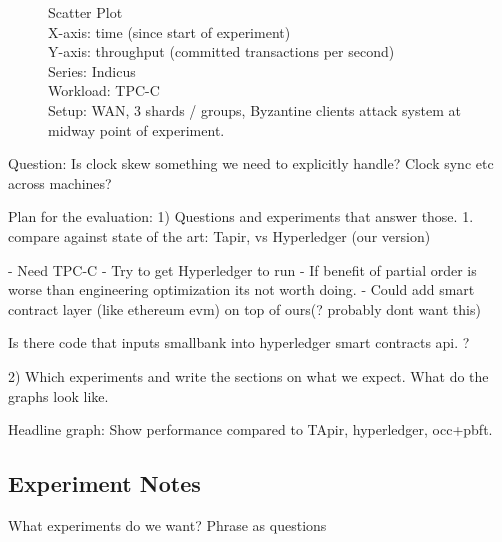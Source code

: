 \begin{figure}
  Scatter Plot\\
  X-axis: time (since start of experiment)\\
  Y-axis: throughput (committed transactions per second)\\
  Series: Indicus\\
  Workload: TPC-C\\
  Setup: WAN, 3 shards / groups, Byzantine clients attack system at midway point
  of experiment.\\
\end{figure}


Question: Is clock skew something we need to explicitly handle? Clock sync etc across machines?

Plan for the evaluation:
1) Questions and experiments that answer those.
  1. compare against state of the art: Tapir, vs Hyperledger (our version)
  

- Need TPC-C
- Try to get Hyperledger to run
- If benefit of partial order is worse than engineering optimization its not worth doing. 
- Could add smart contract layer (like ethereum evm) on top of ours(? probably dont want this)

Is there code that inputs smallbank into hyperledger smart contracts api. ?


2) Which experiments and write the sections on what we expect. What do the graphs look like.


Headline graph: Show performance compared to TApir, hyperledger, occ+pbft.

\subsection{Experiment Notes}
What experiments do we want? Phrase as questions

